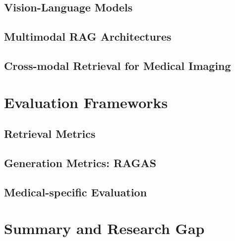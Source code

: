 \subsection{Vision-Language Models}
\label{subsec:background:multimodal:vlm}

\subsection{Multimodal RAG Architectures}
\label{subsec:background:multimodal:rag}

\subsection{Cross-modal Retrieval for Medical Imaging}
\label{subsec:background:multimodal:crossmodal}

%
%
\section{Evaluation Frameworks}
\label{sec:background:evaluation}

\subsection{Retrieval Metrics}
\label{subsec:background:evaluation:retrieval}

\subsection{Generation Metrics: RAGAS}
\label{subsec:background:evaluation:ragas}

\subsection{Medical-specific Evaluation}
\label{subsec:background:evaluation:medical}

%
%
\section{Summary and Research Gap}
\label{sec:background:summary}

